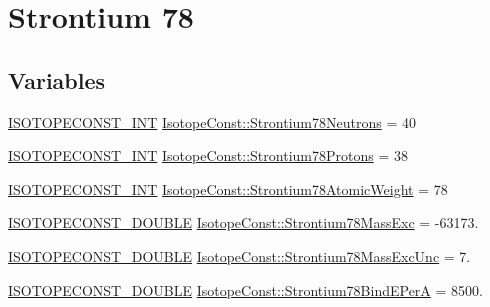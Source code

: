 \hypertarget{group___isotope_const-_strontium-_sr78}{}\section{Strontium 78}
\label{group___isotope_const-_strontium-_sr78}
\subsection*{Variables}
\begin{DoxyCompactItemize}
\item 
\mbox{\hyperlink{group___isotope_const-_macros_ga5f18360b3e99483a35c32d789e62621c}{I\+S\+O\+T\+O\+P\+E\+C\+O\+N\+S\+T\+\_\+\+I\+NT}} \mbox{\hyperlink{group___isotope_const-_strontium-_sr78_ga4c80a91fd4b99dc92a5da89ca1562460}{Isotope\+Const\+::\+Strontium78\+Neutrons}} = 40
\item 
\mbox{\hyperlink{group___isotope_const-_macros_ga5f18360b3e99483a35c32d789e62621c}{I\+S\+O\+T\+O\+P\+E\+C\+O\+N\+S\+T\+\_\+\+I\+NT}} \mbox{\hyperlink{group___isotope_const-_strontium-_sr78_gae8568f43b8a8438798228ddcd57c8ede}{Isotope\+Const\+::\+Strontium78\+Protons}} = 38
\item 
\mbox{\hyperlink{group___isotope_const-_macros_ga5f18360b3e99483a35c32d789e62621c}{I\+S\+O\+T\+O\+P\+E\+C\+O\+N\+S\+T\+\_\+\+I\+NT}} \mbox{\hyperlink{group___isotope_const-_strontium-_sr78_ga09bd745b995b47a63a5a1049d19bda21}{Isotope\+Const\+::\+Strontium78\+Atomic\+Weight}} = 78
\item 
\mbox{\hyperlink{group___isotope_const-_macros_ga8f45a7272ce02c0b4c65c44636ed719a}{I\+S\+O\+T\+O\+P\+E\+C\+O\+N\+S\+T\+\_\+\+D\+O\+U\+B\+LE}} \mbox{\hyperlink{group___isotope_const-_strontium-_sr78_ga6bd9eb3d7701be32d7efc1dea2db3349}{Isotope\+Const\+::\+Strontium78\+Mass\+Exc}} = -\/63173.
\item 
\mbox{\hyperlink{group___isotope_const-_macros_ga8f45a7272ce02c0b4c65c44636ed719a}{I\+S\+O\+T\+O\+P\+E\+C\+O\+N\+S\+T\+\_\+\+D\+O\+U\+B\+LE}} \mbox{\hyperlink{group___isotope_const-_strontium-_sr78_gaa50b62793c2b30a61abbcaf2283870b4}{Isotope\+Const\+::\+Strontium78\+Mass\+Exc\+Unc}} = 7.
\item 
\mbox{\hyperlink{group___isotope_const-_macros_ga8f45a7272ce02c0b4c65c44636ed719a}{I\+S\+O\+T\+O\+P\+E\+C\+O\+N\+S\+T\+\_\+\+D\+O\+U\+B\+LE}} \mbox{\hyperlink{group___isotope_const-_strontium-_sr78_gae7b2d7b79339d30dbdbf14f112ebd5ac}{Isotope\+Const\+::\+Strontium78\+Bind\+E\+PerA}} = 8500.
\item 

\end{DoxyCompactItemize}
